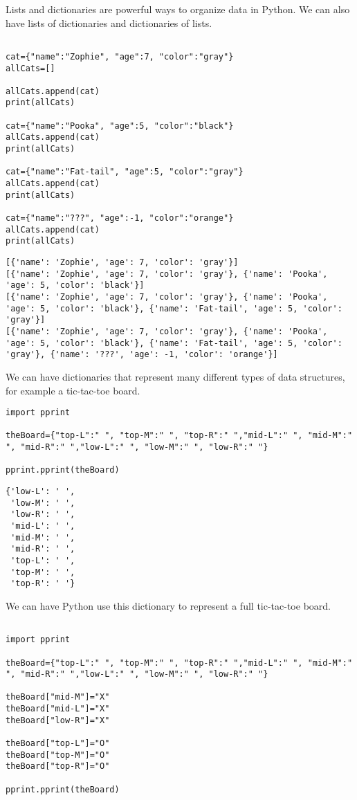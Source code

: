 \documentclass[11pt]{article}
\begin{document}
Lists and dictionaries are powerful ways to organize data in Python. We can also have lists of dictionaries and dictionaries of lists.


\begin{verbatim}

cat={"name":"Zophie", "age":7, "color":"gray"}
allCats=[]

allCats.append(cat)
print(allCats)

cat={"name":"Pooka", "age":5, "color":"black"}
allCats.append(cat)
print(allCats)

cat={"name":"Fat-tail", "age":5, "color":"gray"}
allCats.append(cat)
print(allCats)

cat={"name":"???", "age":-1, "color":"orange"}
allCats.append(cat)
print(allCats)

\end{verbatim}

\begin{verbatim}
[{'name': 'Zophie', 'age': 7, 'color': 'gray'}]
[{'name': 'Zophie', 'age': 7, 'color': 'gray'}, {'name': 'Pooka', 'age': 5, 'color': 'black'}]
[{'name': 'Zophie', 'age': 7, 'color': 'gray'}, {'name': 'Pooka', 'age': 5, 'color': 'black'}, {'name': 'Fat-tail', 'age': 5, 'color': 'gray'}]
[{'name': 'Zophie', 'age': 7, 'color': 'gray'}, {'name': 'Pooka', 'age': 5, 'color': 'black'}, {'name': 'Fat-tail', 'age': 5, 'color': 'gray'}, {'name': '???', 'age': -1, 'color': 'orange'}]
\end{verbatim}


We can have dictionaries that represent many different types of data structures, for example a tic-tac-toe board.


\begin{verbatim}
import pprint

theBoard={"top-L":" ", "top-M":" ", "top-R":" ","mid-L":" ", "mid-M":" ", "mid-R":" ","low-L":" ", "low-M":" ", "low-R":" "}

pprint.pprint(theBoard)

\end{verbatim}

\begin{verbatim}
{'low-L': ' ',
 'low-M': ' ',
 'low-R': ' ',
 'mid-L': ' ',
 'mid-M': ' ',
 'mid-R': ' ',
 'top-L': ' ',
 'top-M': ' ',
 'top-R': ' '}
\end{verbatim}


We can have Python use this dictionary to represent a full tic-tac-toe board.


\begin{verbatim}

import pprint

theBoard={"top-L":" ", "top-M":" ", "top-R":" ","mid-L":" ", "mid-M":" ", "mid-R":" ","low-L":" ", "low-M":" ", "low-R":" "}

theBoard["mid-M"]="X"
theBoard["mid-L"]="X"
theBoard["low-R"]="X"

theBoard["top-L"]="O"
theBoard["top-M"]="O"
theBoard["top-R"]="O"

pprint.pprint(theBoard)

\end{verbatim}
\end{document}
